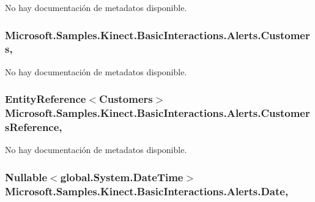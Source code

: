 No hay documentación de metadatos disponible. 

\hypertarget{class_microsoft_1_1_samples_1_1_kinect_1_1_basic_interactions_1_1_alerts_aeaae8d41247ded0e59bd2587a47803e3}{
\subsubsection[{Customers}]{ Microsoft.\-Samples.\-Kinect.\-Basic\-Interactions.\-Alerts.\-Customers\hspace{0.3cm}{\ttfamily [get]}, {\ttfamily [set]}}}\label{class_microsoft_1_1_samples_1_1_kinect_1_1_basic_interactions_1_1_alerts_aeaae8d41247ded0e59bd2587a47803e3}


No hay documentación de metadatos disponible. 

\hypertarget{class_microsoft_1_1_samples_1_1_kinect_1_1_basic_interactions_1_1_alerts_ad352e01bbc5eda222d47ab3b36443b2b}{
\subsubsection[{Customers\-Reference}]{\setlength{\rightskip}{0pt plus 5cm}Entity\-Reference$<${\bf Customers}$>$ Microsoft.\-Samples.\-Kinect.\-Basic\-Interactions.\-Alerts.\-Customers\-Reference\hspace{0.3cm}{\ttfamily [get]}, {\ttfamily [set]}}}\label{class_microsoft_1_1_samples_1_1_kinect_1_1_basic_interactions_1_1_alerts_ad352e01bbc5eda222d47ab3b36443b2b}


No hay documentación de metadatos disponible. 

\hypertarget{class_microsoft_1_1_samples_1_1_kinect_1_1_basic_interactions_1_1_alerts_afd6afb2ab4027c443c57499d942f114f}{
\subsubsection[{Date}]{\setlength{\rightskip}{0pt plus 5cm}Nullable$<$global.\-System.\-Date\-Time$>$ Microsoft.\-Samples.\-Kinect.\-Basic\-Interactions.\-Alerts.\-Date\hspace{0.3cm}{\ttfamily [get]}, {\ttfamily [set]}}}\label{class_microsoft_1_1_samples_1_1_kinect_1_1_basic_interactions_1_1_alerts_afd6afb2ab4027c443c57499d942f114f}


